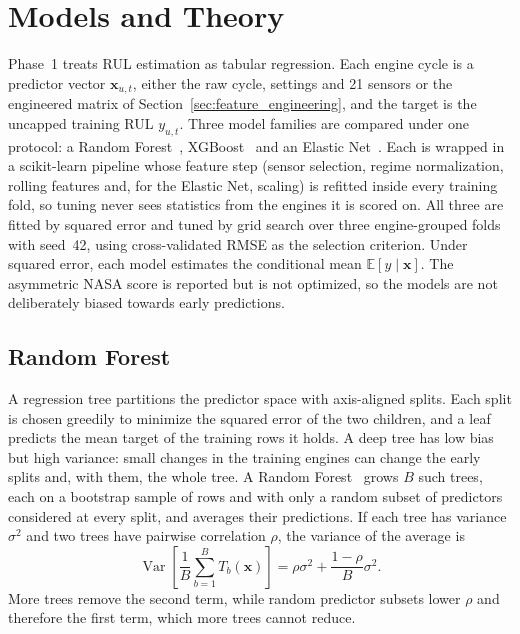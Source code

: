 \section{Models and Theory}
\label{sec:models}

Phase~1 treats RUL estimation as tabular regression. Each engine cycle is a
predictor vector $\mathbf{x}_{u,t}$, either the raw cycle, settings and 21
sensors or the engineered matrix of Section~\ref{sec:feature_engineering},
and the target is the uncapped training RUL $y_{u,t}$. Three model families
are compared under one protocol: a Random Forest~\cite{Breiman2001random},
XGBoost~\cite{Chen2016xgboost} and an Elastic Net~\cite{Zou2005regularization}.
Each is wrapped in a scikit-learn pipeline whose feature step (sensor selection,
regime normalization, rolling features and, for the Elastic Net, scaling) is
refitted inside every training fold, so tuning never sees statistics from the
engines it is scored on. All three are fitted by squared error and tuned by
grid search over three engine-grouped folds with seed~42, using
cross-validated RMSE as the selection criterion. Under squared error, each
model estimates the conditional mean $\mathbb{E}[y\mid\mathbf{x}]$. The
asymmetric NASA score is reported but is not optimized, so the models are not
deliberately biased towards early predictions.

\subsection{Random Forest}
A regression tree partitions the predictor space with axis-aligned splits.
Each split is chosen greedily to minimize the squared error of the two
children, and a leaf predicts the mean target of the training rows it holds.
A deep tree has low bias but high variance: small changes in the training
engines can change the early splits and, with them, the whole tree. A Random
Forest~\cite{Breiman2001random} grows $B$ such trees, each on a bootstrap sample
of rows and with only a random subset of predictors considered at every split,
and averages their predictions. If each tree has variance $\sigma^2$ and two
trees have pairwise correlation $\rho$, the variance of the average
is~\cite{Hastie2009elements}
\begin{equation}
    \operatorname{Var}\!\left[\frac{1}{B}\sum_{b=1}^{B}T_b(\mathbf{x})\right]
    = \rho\sigma^2 + \frac{1-\rho}{B}\sigma^2 .
\end{equation}
More trees remove the second term, while random predictor subsets lower
$\rho$ and therefore the first term, which more trees cannot reduce.

